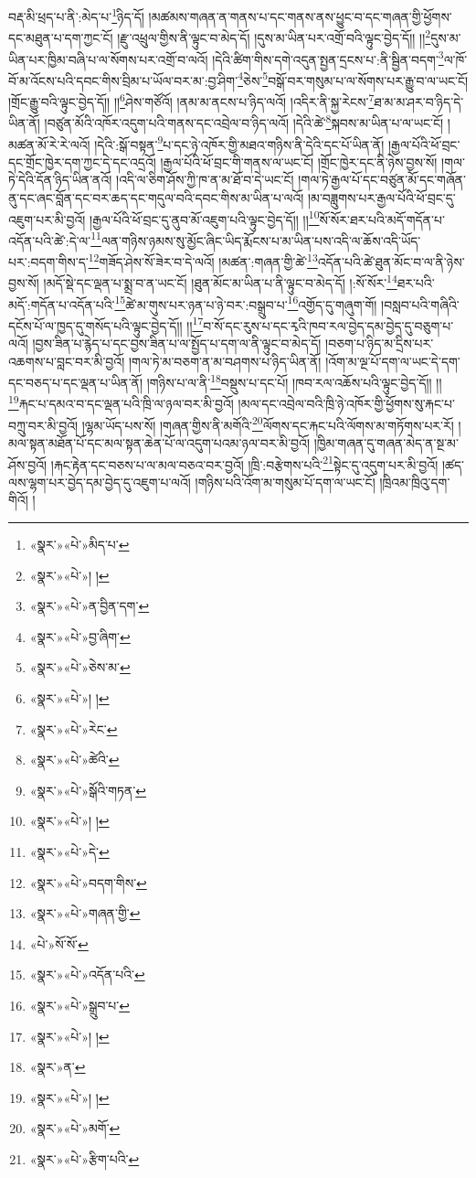 བརྡ་མི་ཕྲད་པ་ནི་:མེད་པ་\footnote{«སྣར་»«པེ་»མིད་པ་}ཉིད་དོ། །མཚམས་གཞན་ན་གནས་པ་དང་གནས་ནས་ཕྱུང་བ་དང་གཞན་གྱི་ཕྱོགས་དང་མཐུན་པ་དག་ཀྱང་ངོ། །རྫུ་འཕྲུལ་གྱིས་ནི་ལྟུང་བ་མེད་དོ། །དུས་མ་ཡིན་པར་འགྲོ་བའི་ལྟུང་བྱེད་དོ།། །།\footnote{«སྣར་»«པེ་»། །}དུས་མ་ཡིན་པར་ཁྱིམ་བཞི་པ་ལ་སོགས་པར་འགྲོ་བ་ལའོ། །དེའི་ཚིག་གིས་དགེ་འདུན་སྤྱན་དྲངས་པ་:ནི་སྦྱིན་བདག་\footnote{«སྣར་»«པེ་»ན་བྱིན་དག་}ལ་ཁོ་བོ་མ་འོངས་པའི་དབང་གིས་བྲིམ་པ་ཡོལ་བར་མ་:བྱ་ཤིག་\footnote{«སྣར་»«པེ་»བྱ་ཞིག་}ཅེས་\footnote{«སྣར་»«པེ་»ཅེས་མ་}བསྒོ་བར་གསུམ་པ་ལ་སོགས་པར་རྒྱུ་བ་ལ་ཡང་ངོ། །གྲོང་རྒྱུ་བའི་ལྟུང་བྱེད་དོ།། །།\footnote{«སྣར་»«པེ་»། །}ཤེས་གཙོའོ། །ནམ་མ་ནངས་པ་ཉིད་ལའོ། །འདིར་ནི་སྐྱ་རེངས་\footnote{«སྣར་»«པེ་»རེང་}ཐ་མ་མ་ཤར་བ་ཉིད་དེ་ཡིན་ནོ། །བཙུན་མོའི་འཁོར་འདུག་པའི་གནས་དང་འབྲེལ་བ་ཉིད་ལའོ། །དེའི་ཚེ་\footnote{«སྣར་»«པེ་»ཚེའི་}སྐབས་མ་ཡིན་པ་ལ་ཡང་ངོ། །མཚན་མོ་རེ་རེ་ལའོ། །དེའི་:སྒོ་བསྟན་\footnote{«སྣར་»«པེ་»སྒོའི་གཏན་}པ་དང་ཉེ་འཁོར་གྱི་མཐའ་གཉིས་ནི་དེའི་དང་པོ་ཡིན་ནོ། །རྒྱལ་པོའི་ཕོ་བྲང་དང་གྲོང་ཁྱེར་དག་ཀྱང་དེ་དང་འདྲའོ། །རྒྱལ་པོའི་ཕོ་བྲང་གི་གནས་ལ་ཡང་ངོ། །གྲོང་ཁྱེར་དང་ནི་ཉེས་བྱས་སོ། །གལ་ཏེ་དེའི་དོན་ཉིད་ཡིན་ནའོ། །འདི་ལ་ཅིག་ཤོས་ཀྱི་ཁ་ན་མ་ཐོ་བ་དེ་ཡང་ངོ། །གལ་ཏེ་རྒྱལ་པོ་དང་བཙུན་མོ་དང་གཞོན་ནུ་དང་ཞང་བློན་དང་བར་ཆད་དང་གདུལ་བའི་དབང་གིས་མ་ཡིན་པ་ལའོ། །མ་བཟླུགས་པར་རྒྱལ་པོའི་ཕོ་བྲང་དུ་འཇུག་པར་མི་བྱའོ། །རྒྱལ་པོའི་ཕོ་བྲང་དུ་ནུབ་མོ་འཇུག་པའི་ལྟུང་བྱེད་དོ།། །།\footnote{«སྣར་»«པེ་»། །}སོ་སོར་ཐར་པའི་མདོ་གདོན་པ་འདོན་པའི་ཚེ་:དེ་ལ་\footnote{«སྣར་»«པེ་»དེ་}ལན་གཉིས་ཉམས་སུ་མྱོང་ཞིང་ཡིད་རྨོངས་པ་མ་ཡིན་པས་འདི་ལ་ཆོས་འདི་ཡོད་པར་:བདག་གིས་ད་\footnote{«སྣར་»«པེ་»བདག་གིས་}གཟོད་ཤེས་སོ་ཟེར་བ་དེ་ལའོ། །མཚན་:གཞན་གྱི་ཚེ་\footnote{«སྣར་»«པེ་»གཞན་གྱི་}འདོན་པའི་ཚེ་ཐུན་མོང་བ་ལ་ནི་ཉེས་བྱས་སོ། །མདོ་སྡེ་དང་ལྡན་པ་སྨྲ་བ་ན་ཡང་ངོ། །ཐུན་མོང་མ་ཡིན་པ་ནི་ལྟུང་བ་མེད་དོ། །:སོ་སོར་\footnote{«པེ་»སོ་སོ་}ཐར་པའི་མདོ་:གདོན་པ་འདོན་པའི་\footnote{«སྣར་»«པེ་»འདོན་པའི་}ཚེ་མ་གུས་པར་ཉན་པ་ཉེ་བར་:བསྒྲུབ་པ་\footnote{«སྣར་»«པེ་»སྒྲུབ་པ་}འགྱོད་དུ་གཞུག་གོ། །བསླབ་པའི་གཞིའི་དངོས་པོ་ལ་ཁྱད་དུ་གསོད་པའི་ལྟུང་བྱེད་དོ།། །།\footnote{«སྣར་»«པེ་»། །}བ་སོ་དང་རུས་པ་དང་རྭའི་ཁབ་རལ་བྱེད་དམ་བྱེད་དུ་བཅུག་པ་ལའོ། །བྱས་ཟིན་པ་རྙེད་པ་དང་བྱས་ཟིན་པ་ལ་སྤྱོད་པ་དག་ལ་ནི་ལྟུང་བ་མེད་དོ། །བཅག་པ་ཉིད་མ་དྲིས་པར་འཆགས་པ་བླང་བར་མི་བྱའོ། །གལ་ཏེ་མ་བཅག་ན་མ་བཤགས་པ་ཉིད་ཡིན་ནོ། །འོག་མ་ལྔ་པོ་དག་ལ་ཡང་དེ་དག་དང་བཅད་པ་དང་ལྡན་པ་ཡིན་ནོ། །གཉིས་པ་ལ་ནི་\footnote{«སྣར་»ན་}བསྡུས་པ་དང་པོ། །ཁབ་རལ་འཆོས་པའི་ལྟུང་བྱེད་དོ།། །།\footnote{«སྣར་»«པེ་»། །}རྐང་པ་དམའ་བ་དང་ལྡན་པའི་ཁྲི་ལ་ཉལ་བར་མི་བྱའོ། །མལ་དང་འབྲེལ་བའི་ཁྲི་ཉེ་འཁོར་གྱི་ཕྱོགས་སུ་རྐང་པ་བཀྲུ་བར་མི་བྱའོ། །ལྷམ་ཡོད་པས་སོ། །གཞན་གྱིས་ནི་མགོའི་\footnote{«སྣར་»«པེ་»མགོ་}ལོགས་དང་རྐང་པའི་ལོགས་མ་གཏོགས་པར་རོ། །མལ་སྟན་མཐོན་པོ་དང་མལ་སྟན་ཆེན་པོ་ལ་འདུག་པའམ་ཉལ་བར་མི་བྱའོ། །ཁྱིམ་གཞན་དུ་གཞན་མེད་ན་སྔ་མ་ཤོས་བྱའོ། །རྐང་རྟེན་དང་བཅས་པ་ལ་མལ་བཅའ་བར་བྱའོ། །ཁྲི་:བརྩེགས་པའི་\footnote{«སྣར་»«པེ་»རྩིག་པའི་}སྟེང་དུ་འདུག་པར་མི་བྱའོ། །ཚད་ལས་ལྷག་པར་བྱེད་དམ་བྱེད་དུ་འཇུག་པ་ལའོ། །གཉིས་པའི་འོག་མ་གསུམ་པོ་དག་ལ་ཡང་ངོ། །ཁྲིའམ་ཁྲིའུ་དག་གིའོ། །
